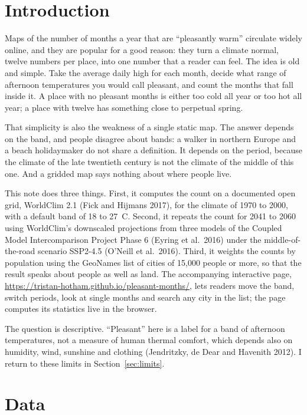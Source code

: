\documentclass[11pt,a4paper]{article}
\begin{document}
\section{Introduction}

Maps of the number of months a year that are ``pleasantly warm'' circulate widely online, and they are popular for a good reason: they turn a climate normal, twelve numbers per place, into one number that a reader can feel. The idea is old and simple. Take the average daily high for each month, decide what range of afternoon temperatures you would call pleasant, and count the months that fall inside it. A place with no pleasant months is either too cold all year or too hot all year; a place with twelve has something close to perpetual spring.

That simplicity is also the weakness of a single static map. The answer depends on the band, and people disagree about bands: a walker in northern Europe and a beach holidaymaker do not share a definition. It depends on the period, because the climate of the late twentieth century is not the climate of the middle of this one. And a gridded map says nothing about where people live.

This note does three things. First, it computes the count on a documented open grid, WorldClim 2.1 (Fick and Hijmans 2017), for the climate of 1970 to 2000, with a default band of 18 to 27~\textdegree C. Second, it repeats the count for 2041 to 2060 using WorldClim's downscaled projections from three models of the Coupled Model Intercomparison Project Phase 6 (Eyring et al.\ 2016) under the middle-of-the-road scenario SSP2-4.5 (O'Neill et al.\ 2016). Third, it weights the counts by population using the GeoNames list of cities of 15,000 people or more, so that the result speaks about people as well as land. The accompanying interactive page, \url{https://tristan-hotham.github.io/pleasant-months/}, lets readers move the band, switch periods, look at single months and search any city in the list; the page computes its statistics live in the browser.

The question is descriptive. ``Pleasant'' here is a label for a band of afternoon temperatures, not a measure of human thermal comfort, which depends also on humidity, wind, sunshine and clothing (Jendritzky, de Dear and Havenith 2012). I return to these limits in Section~\ref{sec:limits}.

\section{Data}
\end{document}
